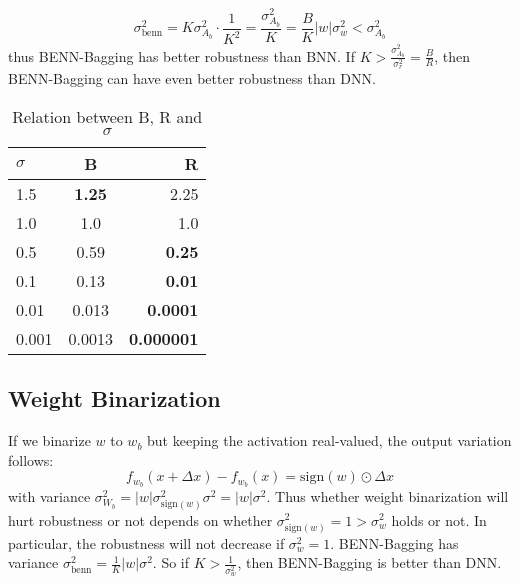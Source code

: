 \documentclass[10pt,twocolumn,letterpaper]{article}
\begin{document}
\[
    \sigma_{\text{benn}}^{2} = K\sigma_{A_{b}}^{2} \cdot \frac{1}{K^{2}} = \frac{\sigma_{A_{b}}^{2}}{K} = \frac{B}{K}|w|\sigma_{w}^{2} < \sigma_{A_{b}}^{2}
\]
thus BENN-Bagging has better robustness than BNN. If $K > \frac{\sigma_{A_{b}}^{2}}{\sigma_{r}^{2}} = \frac{B}{R}$, then BENN-Bagging can have even better robustness than DNN.
\begin{table}
    \caption{Relation between B, R and $\sigma$}
        \centering
        \scriptsize
        \begin{tabular}{lcr}
            \toprule
            \toprule
            $\sigma$ & B & R  \\
            \midrule
            1.5 & \textbf{1.25} & 2.25 \\
            \hline
            1.0 & 1.0 & 1.0 \\
            \hline
            0.5 & 0.59 & \textbf{0.25} \\
            \hline
            0.1 & 0.13 & \textbf{0.01} \\
            \hline
            0.01 & 0.013 & \textbf{0.0001} \\
            \hline
            0.001 & 0.0013 & \textbf{0.000001} \\
            \hline
            \bottomrule
        \end{tabular}
        \label{table:opt_osc_1}
\end{table}
\subsection{Weight Binarization}
\label{sec:wb}
If we binarize $w$ to $w_{b}$ but keeping the activation real-valued, the output variation follows:
\[
    f_{w_{b}}(x+\Delta x) - f_{w_{b}}(x) = \text{sign}(w) \odot \Delta x
\]
with variance $\sigma_{W_{b}}^{2} =  |w|\sigma_{\text{sign}(w)}^{2}\sigma^{2} = |w|\sigma^{2}$. Thus whether weight binarization will hurt robustness or not depends on whether $\sigma_{\text{sign}(w)}^{2} = 1 > \sigma_{w}^{2}$ holds or not. In particular, the robustness will not decrease if $\sigma_{w}^{2} = 1$. BENN-Bagging has variance $\sigma_{\text{benn}}^{2} = \frac{1}{K}|w|\sigma^{2}$. So if $K > \frac{1}{\sigma_{w}^{2}}$, then BENN-Bagging is better than DNN.
\end{document}
